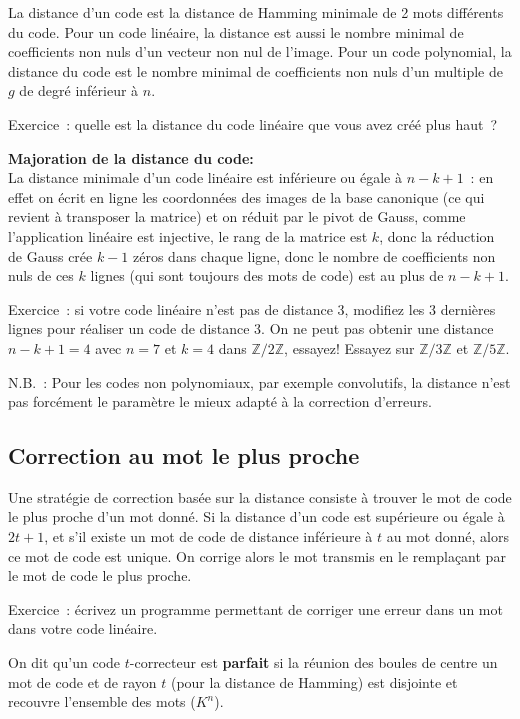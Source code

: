 \documentclass[a4paper,11pt]{book}
\begin{document}
\begin{giacjshere}
La distance d'un code est la distance de Hamming minimale
de 2 mots diff\'erents du code.
Pour un code lin\'eaire, la distance est aussi le nombre minimal
de coefficients non nuls d'un vecteur non nul de l'image.
Pour un code polynomial, la distance du code
est le nombre minimal de coefficients non nuls d'un multiple
de $g$ de degr\'e inf\'erieur \`a $n$.

Exercice~: quelle est la distance du code linéaire que
vous avez créé plus haut~?

{\bf Majoration de la distance du code:}\\
La distance minimale d'un code lin\'eaire est inf\'erieure ou 
\'egale \`a $n-k+1$~: en effet on écrit en ligne les coordonnées
des images de la base canonique (ce qui revient \`a transposer la
matrice) et on réduit par le pivot de Gauss,
comme l'application linéaire est injective, le rang de la matrice
est $k$, donc la réduction de Gauss crée $k-1$
zéros dans chaque ligne, donc le nombre de coefficients non nuls
de ces $k$ lignes (qui sont toujours des mots de code) est 
au plus de $n-k+1$.

Exercice~: si votre code linéaire n'est pas de distance 3, modifiez
les 3 dernières lignes pour réaliser un code de distance 3. On
ne peut pas obtenir une distance $n-k+1=4$ avec $n=7$ et $k=4$ 
dans $\mathbb{Z}/2\mathbb{Z}$, essayez! Essayez sur $\mathbb{Z}/3\mathbb{Z}$ et $\mathbb{Z}/5\mathbb{Z}$.

N.B.~: Pour les codes non
polynomiaux, par exemple convolutifs, la distance n'est pas
forc\'ement le
param\`etre le mieux adapt\'e \`a la correction d'erreurs.

\subsection{Correction au mot le plus proche}
Une strat\'egie de correction bas\'ee sur la distance consiste \`a
trouver le mot de code le plus proche d'un mot donn\'e.
Si la distance d'un code est sup\'erieure ou \'egale
\`a $2t+1$, et s'il existe un mot de code de distance inf\'erieure
\`a $t$ au mot donn\'e, alors ce mot de code est unique.
On corrige alors le mot transmis en le remplaçant par le mot de code
le plus proche.

Exercice~: écrivez un programme permettant de corriger une erreur
dans un mot dans votre code linéaire.

On dit qu'un code $t$-correcteur est 
{\bf parfait} si la réunion des boules
de centre un mot de code et de rayon $t$ (pour la distance de Hamming)
est disjointe et recouvre l'ensemble des mots ($K^n$).


\end{giacjshere}
\end{document}
